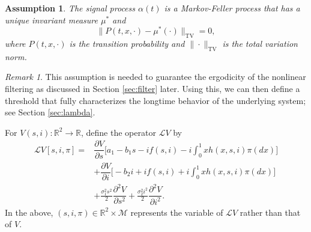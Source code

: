 \documentclass[12pt]{amsart}
\newcommand{\red}[1]{{\leavevmode\color{red}#1}}
\newtheorem {asp}{Assumption}[section]
\theoremstyle{remark}
\newtheorem{rem}{Remark}
\numberwithin{equation}{section}
\newcommand{\M}{\mathcal{M}}
\newcommand{\R}{\mathbb{R}}
\newcommand{\Lom}{\mathcal{L}}
\numberwithin{equation}{section}
\newcommand{\1}{\boldsymbol{1}}
\begin{document}
\begin{asp}\label{asp-2}
	The signal process $\alpha(t)$ is a Markov-Feller process that has a unique invariant measure $\mu^*$ and
		$$
		\|P(t,x,\cdot)-\mu^*(\cdot)\|_{\text{TV}}=0,
		$$
		where $P(t,x,\cdot)$ is the transition probability and $\|\cdot\|_{\text{TV}}$ is the total variation norm.
\end{asp}

\begin{rem}
	This assumption is needed to guarantee the ergodicity of the nonlinear filtering as discussed in Section \ref{sec:filter} later.
	Using this, we can then define a threshold that fully characterizes the longtime behavior of the underlying system; see Section \ref{sec:lambda}.
\end{rem}



For $V(s,i):\R^2\to\R$, define the operator $\Lom V$ by
$$
\begin{aligned}
\Lom V[s,i,\pi]=&\dfrac{\partial V}{\partial s} \Big[a_1-b_1s-if(s,i)-i\int_0^1xh(x,s,i)\pi(dx)\Big]\\
&+\dfrac{\partial V}{\partial i} \Big[-b_2i+if(s,i)+i\int_0^1xh(x,s,i)\pi(dx)\Big]\\
&+\frac{\sigma_1^2s^2}2\dfrac{\partial^2 V}{\partial s^2}+\frac{\sigma_2^2i^2}2\dfrac{\partial^2 V}{\partial i^2}.
\end{aligned}
$$
In the above, $(s,i,\pi)\in\R^2\times \M$ represents the variable of $\Lom V$ rather than that of $V$.
\end{document}
